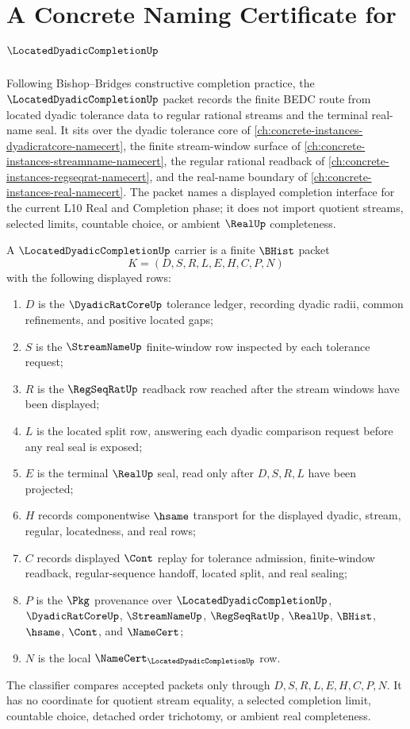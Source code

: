 \chapter{A Concrete Naming Certificate for $\LocatedDyadicCompletionUp$}
\label{ch:concrete-instances-located-dyadic-completion-namecert}

Following Bishop--Bridges constructive completion practice, the $\LocatedDyadicCompletionUp$ packet records the finite BEDC route from located dyadic tolerance data to regular rational streams and the terminal real-name seal. It sits over the dyadic tolerance core of \autoref{ch:concrete-instances-dyadicratcore-namecert}, the finite stream-window surface of \autoref{ch:concrete-instances-streamname-namecert}, the regular rational readback of \autoref{ch:concrete-instances-regseqrat-namecert}, and the real-name boundary of \autoref{ch:concrete-instances-real-namecert}. The packet names a displayed completion interface for the current L10 Real and Completion phase; it does not import quotient streams, selected limits, countable choice, or ambient $\RealUp$ completeness.

\begin{definition}
\label{def:located-dyadic-completion-carrier}
A $\LocatedDyadicCompletionUp$ carrier is a finite $\BHist$ packet
$$
K=(D,S,R,L,E,H,C,P,N)
$$
with the following displayed rows:
\begin{enumerate}
\item $D$ is the $\DyadicRatCoreUp$ tolerance ledger, recording dyadic radii, common refinements, and positive located gaps;
\item $S$ is the $\StreamNameUp$ finite-window row inspected by each tolerance request;
\item $R$ is the $\RegSeqRatUp$ readback row reached after the stream windows have been displayed;
\item $L$ is the located split row, answering each dyadic comparison request before any real seal is exposed;
\item $E$ is the terminal $\RealUp$ seal, read only after $D,S,R,L$ have been projected;
\item $H$ records componentwise $\hsame$ transport for the displayed dyadic, stream, regular, locatedness, and real rows;
\item $C$ records displayed $\Cont$ replay for tolerance admission, finite-window readback, regular-sequence handoff, located split, and real sealing;
\item $P$ is the $\Pkg$ provenance over $\LocatedDyadicCompletionUp$, $\DyadicRatCoreUp$, $\StreamNameUp$, $\RegSeqRatUp$, $\RealUp$, $\BHist$, $\hsame$, $\Cont$, and $\NameCert$;
\item $N$ is the local $\NameCert_{\LocatedDyadicCompletionUp}$ row.
\end{enumerate}
The classifier compares accepted packets only through $D,S,R,L,E,H,C,P,N$. It has no coordinate for quotient stream equality, a selected completion limit, countable choice, detached order trichotomy, or ambient real completeness.
\end{definition}

